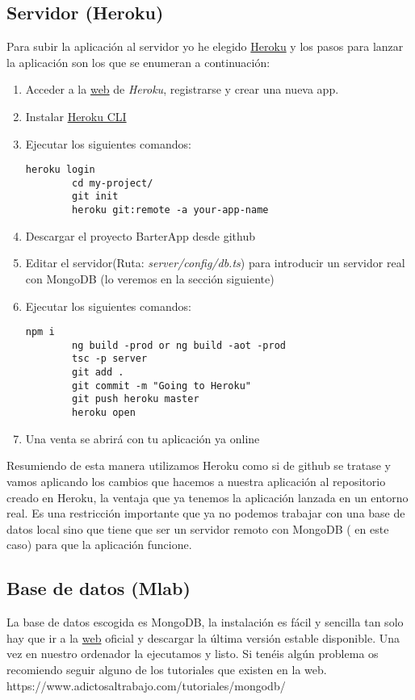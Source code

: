 \subsection{Servidor (Heroku)}
Para subir la aplicación al servidor yo he elegido \href{https://www.heroku.com/}{Heroku} y los pasos para lanzar la aplicación son los que se enumeran a continuación:

\begin{enumerate}
	\item Acceder a la \href{https://www.heroku.com/}{web} de \emph{Heroku}, registrarse y crear una nueva app.
	\item Instalar \href{https://devcenter.heroku.com/articles/heroku-cli}{Heroku CLI}
	\item Ejecutar los siguientes comandos:
		\lstset{language=C, breaklines=true, basicstyle=\footnotesize}
		\begin{lstlisting}[frame=single]
		heroku login
		cd my-project/
		git init
		heroku git:remote -a your-app-name
    	\end{lstlisting}
	\item Descargar el proyecto BarterApp desde github 
	\item Editar el servidor(Ruta: \emph{server/config/db.ts}) para introducir un servidor real con MongoDB (lo veremos en la sección siguiente)
	\item Ejecutar los siguientes comandos:
		\lstset{language=C, breaklines=true, basicstyle=\footnotesize}
		\begin{lstlisting}[frame=single]
		npm i
		ng build -prod or ng build -aot -prod
		tsc -p server
		git add .
		git commit -m "Going to Heroku"
		git push heroku master
		heroku open
    	\end{lstlisting}
	\item Una venta se abrirá con tu aplicación ya online
\end{enumerate}

Resumiendo de esta manera utilizamos Heroku como si de github se tratase y vamos aplicando los cambios que hacemos a nuestra aplicación al repositorio creado en Heroku, la ventaja que ya tenemos la aplicación lanzada en un entorno real. Es una restricción importante que ya no podemos trabajar con una base de datos local sino que tiene que ser un servidor remoto con MongoDB ( en este caso) para que la aplicación funcione.
	

\subsection{Base de datos (Mlab)}
La base de datos escogida es MongoDB, la instalación es fácil y sencilla tan solo hay que ir a la \href{http://www.mongodb.org/downloads}{web} oficial y descargar la última versión estable disponible. Una vez en nuestro ordenador la ejecutamos y listo.  Si tenéis algún problema os recomiendo seguir alguno de los tutoriales que existen en la web. https://www.adictosaltrabajo.com/tutoriales/mongodb/

